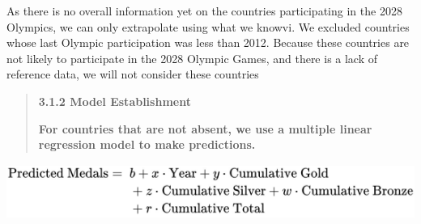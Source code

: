 \documentclass[12pt,a4paper]{article}
\renewenvironment{quote}{\begin{quotation}}{\end{quotation}}  %
\begin{document}
    
    As there is no overall information yet on the countries
    participating in the 2028 Olympics, we can only extrapolate using what
    we knowvi. We excluded countries whose last Olympic participation was
    less than 2012. Because these countries are not likely to participate in
    the 2028 Olympic Games, and there is a lack of reference data, we will
    not consider these countries
    
    \begin{quote}
    \protect{}\label{bookmark28}{}\textbf{3.1.2 Model
    Establishment}
    
    \textbf{For countries that are not absent, we use a multiple linear
    regression model to make predictions.}
    \end{quote}
    
    \includegraphics[width=5.76in,height=0.71833in]{./media/media/image6.png}
    
\end{document}

